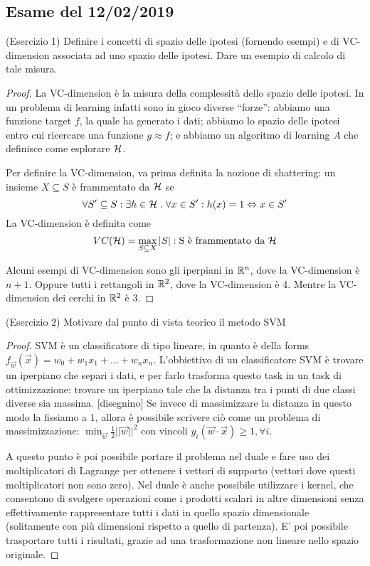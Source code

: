 \documentclass[12pt,a4paper,oneside]{book}
\begin{document}
\subsection{Esame del 12/02/2019}

\begin{exercise}{(Esercizio 1)}
	Definire i concetti di spazio delle ipotesi (fornendo esempi) e di VC-dimension associata ad uno spazio delle ipotesi. Dare un esempio di calcolo di tale misura.
\end{exercise}

\begin{proof}
	La VC-dimension è la misura della complessità dello spazio delle ipotesi. In un problema di learning infatti sono in gioco diverse ``forze'': abbiamo una funzione target $f$, la quale ha generato i dati; abbiamo lo spazio delle ipotesi entro cui ricercare una funzione $g \approx f$; e abbiamo un algoritmo di learning $A$ che definisce come esplorare $\mathcal{H}$.
	
	Per definire la VC-dimension, va prima definita la nozione di shattering: un insieme $X \subseteq S$ è frammentato da $\mathcal{H}$ se 
	\[
		\forall S' \subseteq S \mathrel{:} \exists h \in \mathcal{H} \mathrel{.} \forall x \in S' \mathrel{:} h(x) = 1 \Leftrightarrow x \in S'
	\] 
	La VC-dimension è definita come 
	\[
		VC(\mathcal{H}) = \max_{S \subseteq X} |S| \mathrel{:} \text{S è frammentato da \ensuremath{\mathcal{H}}}
	\]
	
	Alcuni esempi di VC-dimension sono gli iperpiani in $\mathbb{R}^n$, dove la VC-dimension è $n+1$. Oppure tutti i rettangoli in $\mathbb{R}^2$, dove la VC-dimension è 4. Mentre la VC-dimension dei cerchi in $\mathbb{R}^2$ è 3.
\end{proof}

\begin{exercise}{(Esercizio 2)}
	Motivare dal punto di vista teorico il metodo SVM
\end{exercise}

\begin{proof}
	SVM è un classificatore di tipo lineare, in quanto è della forms $f_{\vec{w}} (\vec{x}) = w_0 + w_1 x_1 + ... + w_n x_n$. L'obbiettivo di un classificatore SVM è trovare un iperpiano che separi i dati, e per farlo trasforma questo task in un task di ottimizzazione: trovare un iperpiano tale che la distanza tra i punti di due classi diverse sia massima. [disegnino]
	Se invece di massimizzare la distanza in questo modo la fissiamo a 1, allora è possibile scrivere ciò come un problema di massimizzazione: $\min_{\vec{w}} \frac{1}{2} ||\vec{w}||^2$ con vincoli $y_i (\vec{w} \cdot \vec{x}) \geq 1, \forall i$.
	
	A questo punto è poi possibile portare il problema nel duale e fare uso dei moltiplicatori di Lagrange per ottenere i vettori di supporto (vettori dove questi moltiplicatori non sono zero). Nel duale è anche possibile utilizzare i kernel, che consentono di svolgere operazioni come i prodotti scalari in altre dimensioni senza effettivamente rappresentare tutti i dati in quello spazio dimensionale (solitamente con più dimensioni rispetto a quello di partenza). E' poi possibile trasportare tutti i risultati, grazie ad una trasformazione non lineare nello spazio originale.
\end{proof}
\end{document}
